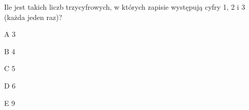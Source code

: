 \begin{tresc}
Ile jest takich liczb trzycyfrowych, w których zapisie występują cyfry 1, 2 i 3 (każda jeden raz)?
\end{tresc}
\begin{wariant}{A} 3 \end{wariant}
\begin{wariant}{B} 4 \end{wariant}
\begin{wariant}{C} 5 \end{wariant}
\begin{wariant}{D} 6 \end{wariant}
\begin{wariant}{E} 9 \end{wariant}
